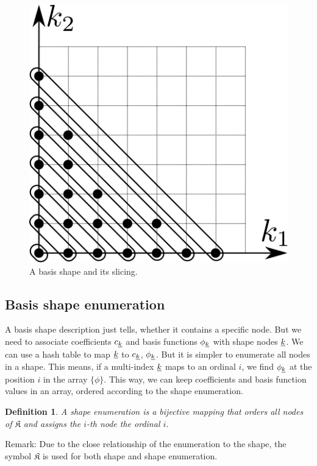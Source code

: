 \documentclass{article}
\newtheorem{definition}{Definition}
\begin{document}
\begin{figure}[H]
  \centering
  \includegraphics[]{shape_slicing}
  \caption{A basis shape and its slicing.}
\end{figure}


\subsection{Basis shape enumeration}
A basis shape description just tells, whether it contains a specific node.
But we need to associate coefficients \(c_{\underline{k}}\)
and basis functions \(\phi_{\underline{k}}\) with shape
nodes \(\underline{k}\). We can use a hash table to map \(\underline{k}\) to
\(c_{\underline{k}}\), \(\phi_{\underline{k}}\). But it is simpler to
enumerate all nodes in a shape. This means, if a multi-index \(\underline{k}\)
maps to an ordinal \(i\), we find \(\phi_{\underline{k}}\) at the position
\(i\) in the array  \(\{\phi\}\).
This way, we can keep coefficients and basis function values in an array,
ordered according to the shape enumeration.

\begin{definition}
  A shape enumeration is a bijective mapping that orders all nodes
  of \( \mathfrak{K} \)
  and assigns the \(i\)-th node the ordinal \(i\).
\end{definition}

Remark: Due to the close relationship of the enumeration to the shape,
the symbol \(\mathfrak{K}\) is used for both shape and
shape enumeration.
\end{document}
